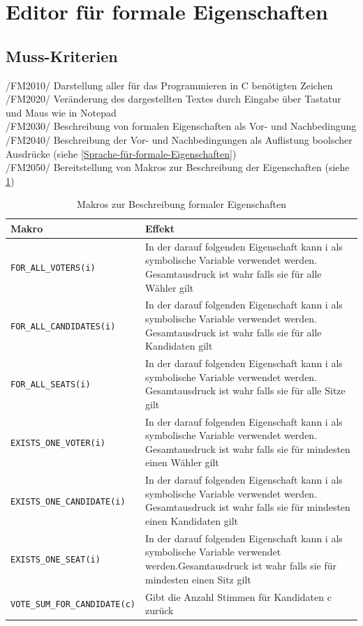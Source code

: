 \documentclass[a4paper]{scrreprt}
\begin{document}
\section{Editor für formale Eigenschaften}
\subsection{Muss-Kriterien}
/FM2010/ Darstellung aller für das Programmieren in C benötigten Zeichen \\
/FM2020/ Veränderung des dargestellten Textes durch Eingabe über Tastatur und Maus wie in Notepad \\
/FM2030/ Beschreibung von formalen Eigenschaften als Vor- und Nachbedingung  \\
/FM2040/ Beschreibung der Vor- und Nachbedingungen als Auflistung boolscher Ausdrücke (siehe \ref{Sprache-für-formale-Eigenschaften})\\
/FM2050/ Bereitstellung von Makros zur Beschreibung der Eigenschaften (siehe \ref{table:Macros_for_formal_Attributes}) \\

\begin{table}[H]
\caption{Makros zur Beschreibung formaler Eigenschaften}
\begin{tabular}{|p{5cm}|p{10cm}|}
\hline 
Makro & Effekt \\
\hline 
\verb!FOR_ALL_VOTERS(i)! & In der darauf folgenden Eigenschaft kann i als symbolische Variable verwendet werden. Gesamtausdruck ist wahr falls sie für alle Wähler gilt \\
\hline 
\verb!FOR_ALL_CANDIDATES(i)! & In der darauf folgenden Eigenschaft kann i als symbolische Variable verwendet werden. Gesamtausdruck ist wahr falls sie für alle Kandidaten gilt \\
\hline 
\verb!FOR_ALL_SEATS(i)! & In der darauf folgenden Eigenschaft kann i als symbolische Variable verwendet werden. Gesamtausdruck ist wahr falls sie für alle Sitze gilt \\
\hline 
\verb!EXISTS_ONE_VOTER(i)! & In der darauf folgenden Eigenschaft kann i als symbolische Variable verwendet werden. Gesamtausdruck ist wahr falls sie für mindesten einen Wähler gilt \\
\hline 
\verb!EXISTS_ONE_CANDIDATE(i)! & In der darauf folgenden Eigenschaft kann i als symbolische Variable verwendet werden. Gesamtausdruck ist wahr falls sie für mindesten einen Kandidaten gilt \\
\hline 
\verb!EXISTS_ONE_SEAT(i)! & In der darauf folgenden Eigenschaft kann i als symbolische Variable verwendet werden.Gesamtausdruck ist wahr falls sie für mindesten einen Sitz gilt \\
\hline 
\verb!VOTE_SUM_FOR_CANDIDATE(c)! & Gibt die Anzahl Stimmen für Kandidaten c zurück\\
\hline 
\end{tabular}
\label{table:Macros_for_formal_Attributes}
\end{table}
\end{document}
